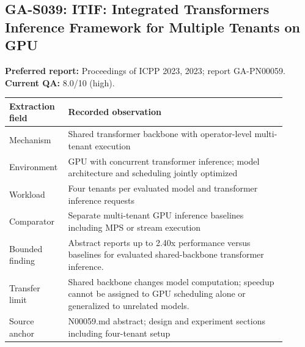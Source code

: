 \subsection{GA-S039: ITIF: Integrated Transformers Inference Framework for Multiple Tenants on GPU}
\textbf{Preferred report:} Proceedings of ICPP 2023, 2023; report GA-PN00059. \textbf{Current QA:} 8.0/10 (high).
\begin{longtable}{P{0.15\linewidth}P{0.75\linewidth}}
\toprule Extraction field & Recorded observation\\\midrule\endhead
Mechanism & Shared transformer backbone with operator-level multi-tenant execution\\
Environment & GPU with concurrent transformer inference; model architecture and scheduling jointly optimized\\
Workload & Four tenants per evaluated model and transformer inference requests\\
Comparator & Separate multi-tenant GPU inference baselines including MPS or stream execution\\
Bounded finding & Abstract reports up to 2.40x performance versus baselines for evaluated shared-backbone transformer inference.\\
Transfer limit & Shared backbone changes model computation; speedup cannot be assigned to GPU scheduling alone or generalized to unrelated models.\\
Source anchor & N00059.md abstract; design and experiment sections including four-tenant setup\\
\bottomrule\end{longtable}
